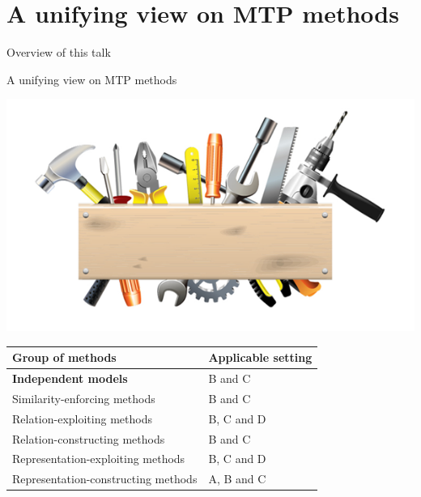 \documentclass[]{beamer}
\renewcommand{\alert}[1]{\textbf{\color{putblue} #1}}
\begin{document}
\section{A unifying view on MTP methods}


\begin{frame}{Overview of this talk}

\tableofcontents

\end{frame}

\begin{frame}{A unifying view on MTP methods}

\begin{center}
\includegraphics[scale=0.3]{pics/tools}

\begin{tabular}{ll}
\hline
Group of methods & Applicable setting \\
\hline
\hline
\alert{Independent models} & B and C \\
Similarity-enforcing methods & B and C   \\ 
Relation-exploiting methods & B, C and D  \\
Relation-constructing methods & B and C \\
Representation-exploiting methods & B, C and D \\
Representation-constructing methods & A, B and C \\
\hline  
\end{tabular}
\end{center}
\end{frame}
\end{document}
